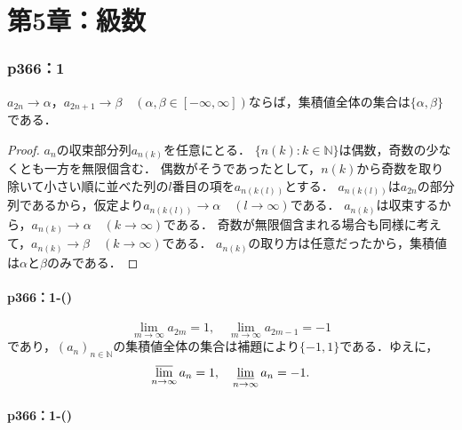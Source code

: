 
\part*{第5章：級数}


\section*{p366：1}

\begin{lemma}{}{}
    $a_{2n} \to \alpha$，$a_{2n+1} \to \beta$$\quad (\alpha,\beta \in [-\infty,\infty])$ならば，集積値全体の集合は$\{\alpha,\beta\}$である．
\end{lemma}
\begin{proof}
    $a_n$の収束部分列$a_{n(k)}$を任意にとる．
    $\{n(k):k \in \mathbb{N}\}$は偶数，奇数の少なくとも一方を無限個含む．
    偶数がそうであったとして，$n(k)$から奇数を取り除いて小さい順に並べた列の$l$番目の項を$a_{n(k(l))}$とする．
    $a_{n(k(l))}$は$a_{2n}$の部分列であるから，仮定より$a_{n(k(l))} \to \alpha \quad (l \to \infty)$である．
    $a_{n(k)}$は収束するから，$a_{n(k)} \to \alpha \quad (k \to \infty)$である．
    奇数が無限個含まれる場合も同様に考えて，$a_{n(k)} \to \beta \quad (k \to \infty)$である．
    $a_{n(k)}$の取り方は任意だったから，集積値は$\alpha$と$\beta$のみである．
\end{proof}

\subsection*{p366：1-()}

\begin{tanswer}
    \[
        \lim_{m \to \infty} a_{2m} = 1 , \quad \lim_{m \to \infty} a_{2m-1} = -1
    \]
    であり，$(a_n)_{n \in \mathbb{N}}$の集積値全体の集合は補題により$\{ -1 , 1 \}$である．ゆえに，
    \[
        \varlimsup_{n \to \infty} a_n = 1 , \quad \varliminf_{n \to \infty} a_n =-1.
    \]
\end{tanswer}


\subsection*{p366：1-()}

